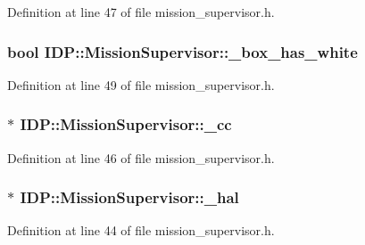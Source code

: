 Definition at line 47 of file mission\_\-supervisor.h.

\hypertarget{classIDP_1_1MissionSupervisor_a44f8ed8b4608c8f607afac445dbb7191}{
\subsubsection[{\_\-box\_\-has\_\-white}]{\setlength{\rightskip}{0pt plus 5cm}bool {\bf IDP::MissionSupervisor::\_\-box\_\-has\_\-white}}}
\label{classIDP_1_1MissionSupervisor_a44f8ed8b4608c8f607afac445dbb7191}


Definition at line 49 of file mission\_\-supervisor.h.

\hypertarget{classIDP_1_1MissionSupervisor_a6409987b663ac1b5c9b989f6dd725e3d}{
\subsubsection[{\_\-cc}]{$\ast$ {\bf IDP::MissionSupervisor::\_\-cc}}}
\label{classIDP_1_1MissionSupervisor_a6409987b663ac1b5c9b989f6dd725e3d}


Definition at line 46 of file mission\_\-supervisor.h.

\hypertarget{classIDP_1_1MissionSupervisor_a31c1a6a71d93c8ae4024eb97b934eb56}{
\subsubsection[{\_\-hal}]{$\ast$ {\bf IDP::MissionSupervisor::\_\-hal}}}
\label{classIDP_1_1MissionSupervisor_a31c1a6a71d93c8ae4024eb97b934eb56}


Definition at line 44 of file mission\_\-supervisor.h.

